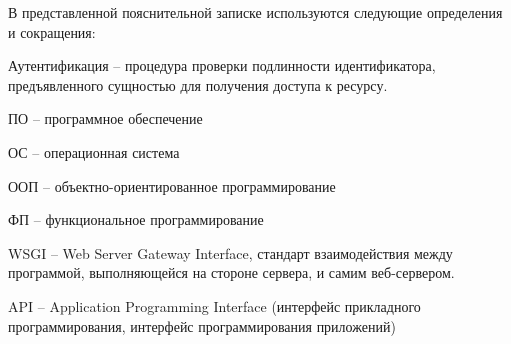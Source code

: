 
В представленной пояснительной записке используются следующие определения и сокращения:

Аутентификация -- процедура проверки подлинности идентификатора, предъявленного сущностью для получения доступа к ресурсу.

ПО -- программное обеспечение

ОС -- операционная система

ООП -- объектно-ориентированное программирование

ФП -- функциональное программирование

WSGI -- Web Server Gateway Interface, стандарт взаимодействия между программой, выполняющейся на стороне сервера, и самим веб-сервером.

API -- Application Programming Interface (интерфейс прикладного программирования, интерфейс программирования приложений)


\clearpage